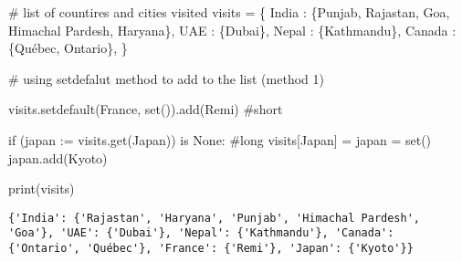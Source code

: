 \documentclass[
]{report}
\newenvironment{Shaded}{\begin{snugshade}}{\end{snugshade}}
\newcommand{\BuiltInTok}[1]{\textcolor[rgb]{0.00,0.23,0.31}{#1}}
\newcommand{\CommentTok}[1]{\textcolor[rgb]{0.37,0.37,0.37}{#1}}
\newcommand{\ControlFlowTok}[1]{\textcolor[rgb]{0.00,0.23,0.31}{#1}}
\newcommand{\KeywordTok}[1]{\textcolor[rgb]{0.00,0.23,0.31}{#1}}
\newcommand{\NormalTok}[1]{\textcolor[rgb]{0.00,0.23,0.31}{#1}}
\newcommand{\OperatorTok}[1]{\textcolor[rgb]{0.37,0.37,0.37}{#1}}
\newcommand{\StringTok}[1]{\textcolor[rgb]{0.13,0.47,0.30}{#1}}
\newcommand{\VariableTok}[1]{\textcolor[rgb]{0.07,0.07,0.07}{#1}}
\begin{document}
\begin{Shaded}
\begin{Highlighting}[]
\CommentTok{\# list of countires and cities visited}
\NormalTok{visits }\OperatorTok{=}\NormalTok{ \{}
    \StringTok{\textquotesingle{}India\textquotesingle{}}\NormalTok{ : \{}\StringTok{\textquotesingle{}Punjab\textquotesingle{}}\NormalTok{, }\StringTok{\textquotesingle{}Rajastan\textquotesingle{}}\NormalTok{, }\StringTok{\textquotesingle{}Goa\textquotesingle{}}\NormalTok{, }\StringTok{\textquotesingle{}Himachal Pardesh\textquotesingle{}}\NormalTok{, }\StringTok{\textquotesingle{}Haryana\textquotesingle{}}\NormalTok{\},}
    \StringTok{\textquotesingle{}UAE\textquotesingle{}}\NormalTok{ : \{}\StringTok{\textquotesingle{}Dubai\textquotesingle{}}\NormalTok{\},}
    \StringTok{\textquotesingle{}Nepal\textquotesingle{}}\NormalTok{ : \{}\StringTok{\textquotesingle{}Kathmandu\textquotesingle{}}\NormalTok{\},}
    \StringTok{\textquotesingle{}Canada\textquotesingle{}}\NormalTok{ : \{}\StringTok{\textquotesingle{}Québec\textquotesingle{}}\NormalTok{, }\StringTok{\textquotesingle{}Ontario\textquotesingle{}}\NormalTok{\},}
\NormalTok{\}}


\CommentTok{\# using setdefalut method to add to the list (method 1)}

\NormalTok{visits.setdefault(}\StringTok{\textquotesingle{}France\textquotesingle{}}\NormalTok{, }\BuiltInTok{set}\NormalTok{()).add(}\StringTok{\textquotesingle{}Remi\textquotesingle{}}\NormalTok{)  }\CommentTok{\#short}

\ControlFlowTok{if}\NormalTok{ (japan }\OperatorTok{:=}\NormalTok{ visits.get(}\StringTok{\textquotesingle{}Japan\textquotesingle{}}\NormalTok{)) }\KeywordTok{is} \VariableTok{None}\NormalTok{:      }\CommentTok{\#long}
\NormalTok{    visits[}\StringTok{\textquotesingle{}Japan\textquotesingle{}}\NormalTok{] }\OperatorTok{=}\NormalTok{ japan }\OperatorTok{=} \BuiltInTok{set}\NormalTok{()}
\NormalTok{japan.add(}\StringTok{\textquotesingle{}Kyoto\textquotesingle{}}\NormalTok{)}

\BuiltInTok{print}\NormalTok{(visits)}
\end{Highlighting}
\end{Shaded}

\begin{verbatim}
{'India': {'Rajastan', 'Haryana', 'Punjab', 'Himachal Pardesh', 'Goa'}, 'UAE': {'Dubai'}, 'Nepal': {'Kathmandu'}, 'Canada': {'Ontario', 'Québec'}, 'France': {'Remi'}, 'Japan': {'Kyoto'}}
\end{verbatim}
\end{document}
